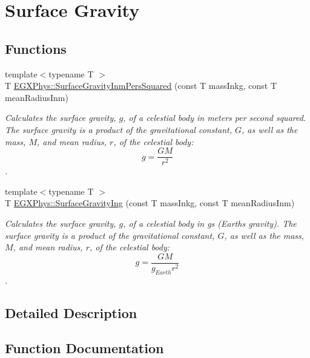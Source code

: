 \hypertarget{group___e_g_x_phys-_astrophysics-_surface_gravity}{}\section{Surface Gravity}
\label{group___e_g_x_phys-_astrophysics-_surface_gravity}
\subsection*{Functions}
\begin{DoxyCompactItemize}
\item 
{\footnotesize template$<$typename T $>$ }\\T \mbox{\hyperlink{group___e_g_x_phys-_astrophysics-_surface_gravity_gaf7e1f42b674fe8bb2211c40882a7d5b6}{E\+G\+X\+Phys\+::\+Surface\+Gravity\+Inm\+Pers\+Squared}} (const T mass\+Inkg, const T mean\+Radius\+Inm)
\begin{DoxyCompactList}\small\item\em Calculates the surface gravity, $g$, of a celestial body in meters per second squared. The surface gravity is a product of the gravitational constant, $G$, as well as the mass, $M$, and mean radius, $r$, of the celestial body\+: \[g = \frac{GM}{r^2}\]. \end{DoxyCompactList}\item 
{\footnotesize template$<$typename T $>$ }\\T \mbox{\hyperlink{group___e_g_x_phys-_astrophysics-_surface_gravity_gab5bb479758d72608ef6ada063f6c1a1b}{E\+G\+X\+Phys\+::\+Surface\+Gravity\+Ing}} (const T mass\+Inkg, const T mean\+Radius\+Inm)
\begin{DoxyCompactList}\small\item\em Calculates the surface gravity, $g$, of a celestial body in gs (Earth\textquotesingle{}s gravity). The surface gravity is a product of the gravitational constant, $G$, as well as the mass, $M$, and mean radius, $r$, of the celestial body\+: \[g = \frac{GM}{g_{Earth}r^2}\]. \end{DoxyCompactList}\end{DoxyCompactItemize}


\subsection{Detailed Description}


\subsection{Function Documentation}
\mbox{\label{group___e_g_x_phys-_astrophysics-_surface_gravity_gab5bb479758d72608ef6ada063f6c1a1b}} 
